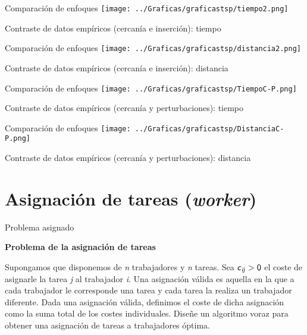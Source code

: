 \documentclass[10pt, xcolor=table]{beamer}
\begin{document}
\begin{frame}[fragile]{Comparación de enfoques}
\texttt{[image: ../Graficas/graficastsp/tiempo2.png]}
\begin{center}
	\footnotesize{Contraste de datos empíricos (cercanía e inserción): tiempo}
\end{center}
\end{frame}

\begin{frame}[fragile]{Comparación de enfoques}
\texttt{[image: ../Graficas/graficastsp/distancia2.png]}
\begin{center}
	\footnotesize{Contraste de datos empíricos (cercanía e inserción): distancia}
\end{center}
\end{frame}

\begin{frame}[fragile]{Comparación de enfoques}
\texttt{[image: ../Graficas/graficastsp/TiempoC-P.png]}
\begin{center}
	\footnotesize{Contraste de datos empíricos (cercanía y perturbaciones): tiempo}
\end{center}
\end{frame}

\begin{frame}[fragile]{Comparación de enfoques}
\texttt{[image: ../Graficas/graficastsp/DistanciaC-P.png]}
\begin{center}
	\footnotesize{Contraste de datos empíricos (cercanía y perturbaciones): distancia}
\end{center}
\end{frame}

\section{Asignación de tareas (\emph{worker})}

\begin{frame}{Problema asignado}
\begin{center}
\textbf{\large{Problema de la asignación de tareas}}
\end{center}
Supongamos que disponemos de \emph{n} trabajadores y \emph{n} tareas. Sea $\text{\sffamily \emph{c}}_\text{\sffamily \emph{ij}} > \text{\sffamily 0}$ el coste de asignarle la tarea \emph{j} al trabajador \emph{i}. Una asignación válida es aquella en la que a cada trabajador le corresponde una tarea y cada tarea la realiza un trabajador diferente. Dada una asignación válida, definimos el coste de dicha asignación como la suma total de los costes individuales. Diseñe un algoritmo voraz para obtener una asignación de tareas a trabajadores óptima.
\end{frame}
\end{document}
